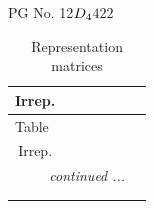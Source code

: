 \documentclass[fleqn,8pt,landscape]{jsarticle}
\begin{document}
\setcounter{MaxMatrixCols}{32}

\renewcommand{\tablename}{Table~}
\renewcommand{\figurename}{Figure~}
\begin{center}
\LARGE
PG No. 12\quad$D_{\rm 4}$\quad$422$\quad[ tetragonal ]
\end{center}
\renewcommand{\arraystretch}{1.2}
\begin{longtable}{ccccccc}
\caption{Representation matrices}
 \\
 \hline \hline
Irrep. &  &  &  &  &  &  \\ \hline \endfirsthead

\multicolumn{6}{l}{\tablename\ \thetable{}} \\
 \hline \hline
Irrep. &  &  &  &  &  &  \\ \hline \endhead

 \hline \hline
\multicolumn{6}{r}{\footnotesize\it continued ...} \\ \endfoot

 \hline \hline
\multicolumn{6}{r}{} \\ \endlastfoot


\end{longtable}
\end{document}
